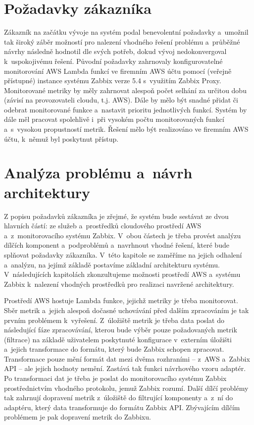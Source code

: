 \documentclass[czech, ing, kiv, he, iso690]{fasthesis}
\begin{document}
\section{Požadavky zákazníka}
Zákazník na začátku vývoje na systém podal benevolentní požadavky a~umožnil tak široký záběr možností pro nalezení vhodného řešení problému a~průběžné návrhy následně hodnotil dle svých potřeb, dokud vývoj nedokonvergoval k~uspokojivému řešení. Původní požadavky zahrnovaly konfigurovatelné monitorování AWS Lambda funkcí ve firemním AWS účtu pomocí (veřejně přístupné) instance systému Zabbix verze 5.4 s~využitím Zabbix Proxy. Monitorované metriky by měly zahrnovat alespoň počet selhání za určitou dobu (závisí na provozovateli cloudu, t.j. AWS). Dále by mělo být snadné přidat či odebrat monitorované funkce a~nastavit prioritu jednotlivých funkcí. Systém by dále měl pracovat spolehlivě i~při vysokém počtu monitorovaných funkcí a~s~vysokou propustností metrik. Řešení mělo být realizováno ve firemním AWS účtu, k~němuž byl poskytnut přístup.

\section{Analýza problému a~návrh architektury}

Z popisu požadavků zákazníka je zřejmé, že systém bude sestávat ze dvou hlavních částí: ze služeb a~prostředků cloudového prostředí AWS a~z~monitorovacího systému Zabbix. V~obou částech je třeba provést analýzu dílčích komponent a~podproblémů a~navrhnout vhodné řešení, které bude splňovat požadavky zákazníka. V~této kapitole se zaměříme na jejich odhalení a~analýzu, na jejímž základě postavíme základní architekturu systému. V~následujících kapitolách zkonzultujeme možnosti prostředí AWS a~systému Zabbix k~nalezení vhodných prostředků pro realizaci navržené architektury.

Prostředí AWS hostuje Lambda funkce, jejichž metriky je třeba monitorovat. Sběr metrik a~jejich alespoň dočasné uchovávání před dalším zpracováním je tak prvním problémem k~vyřešení. Z~úložiště metrik je třeba data poslat do následující fáze zpracovávání, kterou bude výběr pouze požadovaných metrik (filtrace) na základě uživatelem poskytnuté konfigurace v~externím úložišti a~jejich transformace do formátu, který bude Zabbix schopen zpracovat. Transformace pouze mění formát dat mezi dvěma rozhraními -- z~AWS a~Zabbix API -- ale jejich hodnoty nemění. Zastává tak funkci návrhového vzoru adaptér. Po transformaci dat je třeba je poslat do monitorovacího systému Zabbix prostřednictvím vhodného protokolu, jemuž Zabbix rozumí. Další dílčí problémy tak zahrnují dopravení metrik z~úložiště do filtrující komponenty a~z~ní do adaptéru, který data transformuje do formátu Zabbix API. Zbývajícím dílčím problémem je pak dopravení metrik do Zabbixu.
\end{document}
